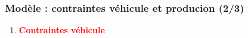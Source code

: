 \documentclass[hyperref={bookmarks=false},aspectratio=169]{beamer}
\begin{document}
\begin{frame}	
\frametitle{Modèle : contraintes véhicule et producion (2/3)}
\begin{enumerate}


	
\item \textbf{\textcolor{red}{Contraintes véhicule}} 
\begin{itemize}


\end{itemize}
\end{enumerate}
\end{frame}
\end{document}
